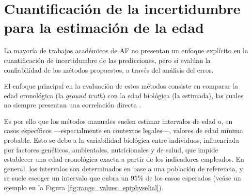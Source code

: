 
\section{Cuantificación de la incertidumbre para la estimación de la edad}


La mayoría de trabajos académicos de AF no presentan un enfoque explícito en la cuantificación de incertidumbre de las predicciones, pero sí evalúan la confiabilidad de los métodos propuestos, a través del análisis del error. 

El enfoque principal en la evaluación de estos métodos consiste en comparar la edad cronológica (la \textit{ground truth}) con la edad biológica (la estimada), las cuales no siempre presentan una correlación directa \cite{marquez2015}.

Es por ello que los métodos manuales suelen estimar intervalos de edad o, en casos específicos ---especialmente en contextos legales---, valores de edad mínima probable. Esto se debe a la variabilidad biológica entre individuos, influenciada por factores genéticos, ambientales, nutricionales y de salud, que impide establecer una edad cronológica exacta a partir de los indicadores empleados. En general, los intervalos son determinados en base a una población de referencia, y se suele escoger un intervalo que cubra un 95\% de los casos esperados \cite{garvin2012} (veáse un ejemplo en la Figura \ref{fig:range_values_epiphyselial}).

